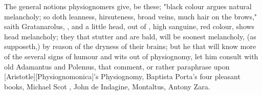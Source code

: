 The general notions physiognomers give, be these; "black
colour argues natural melancholy; so doth leanness, hirsuteness, broad veins,
much hair on the brows," saith Gratanarolus,
, and a little head, out of \Aristotle{}, high
sanguine, red colour, shows head melancholy; they that stutter and are bald,
will be soonest melancholy, (as \Avicenna{} supposeth,) by reason of the dryness
of their brains; but he that will know more of the several signs of humour and
wits out of physiognomy, let him consult with old Adamantus and Polemus, that
comment, or rather paraphrase upon [Aristotle][\textlatin{Physiognomonica}]'s Physiognomy, Baptista Porta's
four pleasant books, Michael Scot ,
John de Indagine, Montaltus, Antony Zara. 

